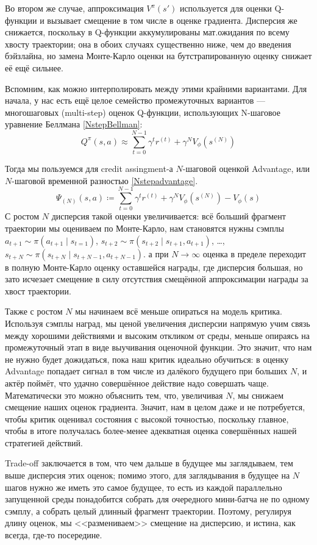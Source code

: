 Во втором же случае, аппроксимация $V^\pi(s')$ используется для оценки Q-функции и вызывает смещение в том числе в оценке градиента. Дисперсия же снижается, поскольку в Q-функции аккумулированы мат.ожидания по всему хвосту траектории; она в обоих случаях существенно ниже, чем до введения бэйзлайна, но замена Монте-Карло оценки на бутстрапированную оценку снижает её ещё сильнее.

Вспомним, как можно интерполировать между этими крайними вариантами. Для начала, у нас есть ещё целое семейство промежуточных вариантов --- многошаговых (multi-step) оценок Q-функции, использующих N-шаговое уравнение Беллмана \eqref{NstepBellman}:
$$Q^\pi(s, a) \approx \sum_{t=0}^{N-1} \gamma^{t} r^{(t)} + \gamma^N V_{\phi}(s^{(N)}) $$

Тогда мы пользуемся для credit assingment-а $N$-шаговой оценкой Advantage, или $N$-шаговой временной разностью \eqref{Nstepadvantage}.
$$\Psi_{(N)}(s, a) \coloneqq \sum_{t=0}^{N-1} \gamma^{t} r^{(t)} + \gamma^N V_{\phi}(s^{(N)}) - V_{\phi}(s)$$
С ростом $N$ дисперсия такой оценки увеличивается: всё больший фрагмент траектории мы оцениваем по Монте-Карло, нам становятся нужны сэмплы $a_{t+1} \sim \pi(a_{t+1} \mid s_{t=1})$, $s_{t+2} \sim \pi(s_{t+2} \mid s_{t+1}, a_{t+1})$, \dots , $s_{t+N} \sim \pi(s_{t+N} \mid s_{t+N-1}, a_{t+N-1})$. а при $N \to \infty$ оценка в пределе переходит в полную Монте-Карло оценку оставшейся награды, где дисперсия большая, но зато исчезает смещение в силу отсутствия смещённой аппроксимации награды за хвост траектории. 

Также с ростом $N$ мы начинаем всё меньше опираться на модель критика. Используя сэмплы наград, мы ценой увеличения дисперсии напрямую учим связь между хорошими действиями и высоким откликом от среды, меньше опираясь на промежуточный этап в виде выучивания оценочной функции. Это значит, что нам не нужно будет дожидаться, пока наш критик идеально обучиться: в оценку Advantage попадает сигнал в том числе из далёкого будущего при больших $N$, и актёр поймёт, что удачно совершённое действие надо совершать чаще. Математически это можно объяснить тем, что, увеличивая $N$, мы снижаем смещение наших оценок градиента. Значит, нам в целом даже и не потребуется, чтобы критик оценивал состояния с высокой точностью, поскольку главное, чтобы в итоге получалась более-менее адекватная оценка совершённых нашей стратегией действий.

Trade-off заключается в том, что чем дальше в будущее мы заглядываем, тем выше дисперсия этих оценок; помимо этого, для заглядывания в будущее на $N$ шагов нужно же иметь это самое будущее, то есть из каждой параллельно запущенной среды понадобится собрать для очередного мини-батча не по одному сэмплу, а собрать целый длинный фрагмент траектории. Поэтому, регулируя длину оценок, мы <<размениваем>> смещение на дисперсию, и истина, как всегда, где-то посередине.

